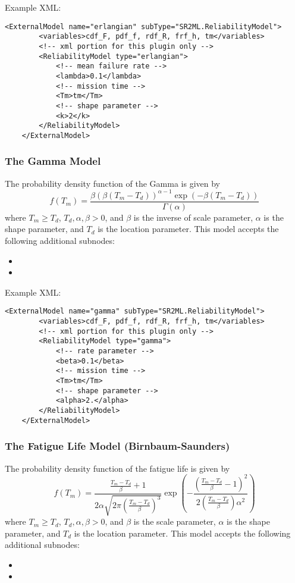 Example XML:
\begin{lstlisting}[style=XML]
	<ExternalModel name="erlangian" subType="SR2ML.ReliabilityModel">
		<variables>cdf_F, pdf_f, rdf_R, frf_h, tm</variables>
		<!-- xml portion for this plugin only -->
		<ReliabilityModel type="erlangian">
			<!-- mean failure rate -->
			<lambda>0.1</lambda>
			<!-- mission time -->
			<Tm>tm</Tm>
			<!-- shape parameter -->
			<k>2</k>
		</ReliabilityModel>
	</ExternalModel>
\end{lstlisting}


\subsubsection{The Gamma Model}
The probability density function of the Gamma is given by
\begin{equation}
	f(T_m) = \frac{\beta \left(\beta \left(T_m-T_d\right)\right)^{\alpha-1}\exp\left(-\beta\left(T_m-T_d\right)\right)}{\Gamma \left(\alpha\right)}
\end{equation}
where $T_m\geq T_d$, $T_d, \alpha, \beta >0$, and $\beta$ is the inverse of scale parameter, $\alpha$ is the shape
parameter, and $T_d$ is the location parameter.
This model accepts the following additional subnodes:
\begin{itemize}
	\item {}
	\item {}
\end{itemize}

Example XML:
\begin{lstlisting}[style=XML]
	<ExternalModel name="gamma" subType="SR2ML.ReliabilityModel">
		<variables>cdf_F, pdf_f, rdf_R, frf_h, tm</variables>
		<!-- xml portion for this plugin only -->
		<ReliabilityModel type="gamma">
			<!-- rate parameter -->
			<beta>0.1</beta>
			<!-- mission time -->
			<Tm>tm</Tm>
			<!-- shape parameter -->
			<alpha>2.</alpha>
		</ReliabilityModel>
	</ExternalModel>
\end{lstlisting}


\subsubsection{The Fatigue Life Model (Birnbaum-Saunders)}
The probability density function of the fatigue life is given by
\begin{equation}
	f(T_m) = \frac{\frac{T_m-T_d}{\beta}+1}{2\alpha\sqrt{2\pi\left(\frac{T_m-T_d}{\beta}\right)^3}}
				 \exp\left(-\frac{\left(\frac{T_m-T_d}{\beta}-1\right)^2}{2\left(\frac{T_m-T_d}{\beta}\right)\alpha^2}\right)
\end{equation}
where $T_m\geq T_d$, $T_d, \alpha, \beta >0$, and $\beta$ is the scale parameter, $\alpha$ is the shape
parameter, and $T_d$ is the location parameter.
This model accepts the following additional subnodes:
\begin{itemize}
	\item {}
	\item {}
\end{itemize}

